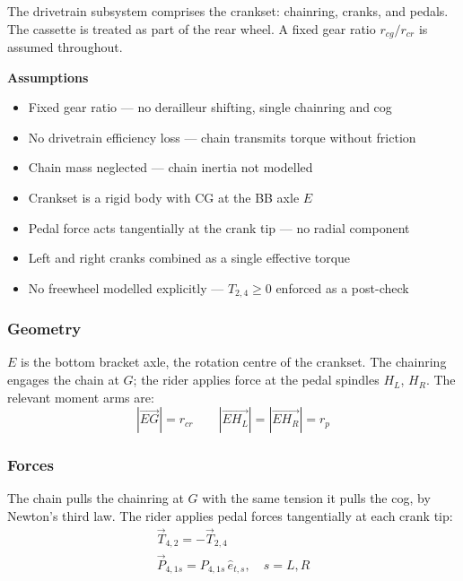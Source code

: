 \documentclass[10pt]{extarticle}
\numberwithin{equation}{subsubsection}
\begin{document}
The drivetrain subsystem comprises the crankset: chainring, cranks, and pedals. The cassette is treated as part of the rear wheel. A fixed gear ratio $r_{cg}/r_{cr}$ is assumed throughout.

\textbf{Assumptions}
\begin{itemize}
    \item Fixed gear ratio --- no derailleur shifting, single chainring and cog
    \item No drivetrain efficiency loss --- chain transmits torque without friction
    \item Chain mass neglected --- chain inertia not modelled
    \item Crankset is a rigid body with CG at the BB axle $E$
    \item Pedal force acts tangentially at the crank tip --- no radial component
    \item Left and right cranks combined as a single effective torque
    \item No freewheel modelled explicitly --- $T_{2,4} \ge 0$ enforced as a post-check
\end{itemize}

\subsubsection{Geometry}

$E$ is the bottom bracket axle, the rotation centre of the crankset. The chainring engages the chain at $G$; the rider applies force at the pedal spindles $H_L$, $H_R$. The relevant moment arms are:
\begin{equation}
    |\vec{EG}| = r_{cr} \qquad |\vec{EH_L}| = |\vec{EH_R}| = r_p
\end{equation}

\subsubsection{Forces}

The chain pulls the chainring at $G$ with the same tension it pulls the cog, by Newton's third law. The rider applies pedal forces tangentially at each crank tip:
\begin{gather}
    \vec{T}_{4,2} = -\vec{T}_{2,4} \\
    \vec{P}_{4,1s} = P_{4,1s}\,\hat{e}_{t,s}, \quad s = L,R
\end{gather}
\end{document}
